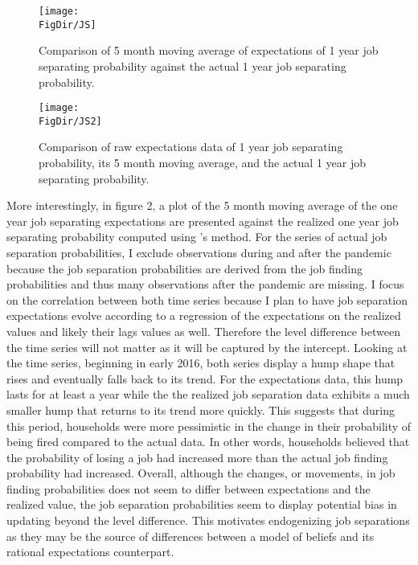 \documentclass[titlepage]{\econtex}\providecommand{\texname}{Dissertation-Proposal}
\providecommand{\FigDir}{Figures}
\begin{document}
\begin{figure}{}
    \centering\texttt{[image: \\FigDir/JS]}
    \caption{Comparison of 5 month moving average of expectations of 1 year job separating probability against the actual 1 year job separating probability. }
\end{figure}



\begin{figure}{}
    \centering\texttt{[image: \\FigDir/JS2]}
    \caption{Comparison of raw expectations data of 1 year job separating probability, its 5 month moving average, and  the actual 1 year job separating probability. }
\end{figure}




More interestingly, in figure 2, a plot of the 5 month moving average of the  one year job separating expectations are presented against the realized one year job separating probability computed using \cite{shimer2012reassessing}'s method. For the series of actual job separation probabilities, I exclude observations during and after the pandemic because the job separation probabilities are derived from the job finding probabilities and thus many observations after the pandemic are missing. I focus on the correlation between both time series because I plan to have job separation expectations evolve according to a regression of the expectations on the realized values and likely their lags values as well.  Therefore the level difference between the time series will not matter as it will be captured by the intercept. Looking at the time series, beginning in early 2016, both series display a hump shape that rises and eventually falls back to its trend. For the expectations data, this hump lasts for at least a year while the the realized job separation data exhibits a much smaller hump that returns to its trend more quickly. This suggests that during this period, households were more pessimistic in the change in their probability of being fired compared to the actual data. In other words, households believed that the probability of losing a job had increased more than the actual job finding probability had increased. Overall, although the changes, or movements, in job finding probabilities does not seem to differ between expectations and the realized value, the job separation probabilities seem to display potential bias in updating beyond the level difference. This motivates endogenizing job separations as they may be the source of differences between a model of beliefs and its rational expectations counterpart.\\
\end{document}
